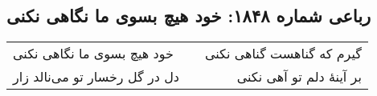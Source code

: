 \begin{center}
\section*{رباعی شماره ۱۸۴۸: خود هیچ بسوی ما نگاهی نکنی}
\label{sec:1848}
\begin{longtable}{l p{0.5cm} r}
خود هیچ بسوی ما نگاهی نکنی
&&
گیرم که گناهست گناهی نکنی
\\
دل در گل رخسار تو می‌نالد زار
&&
بر آینهٔ دلم تو آهی نکنی
\\
\end{longtable}
\end{center}
